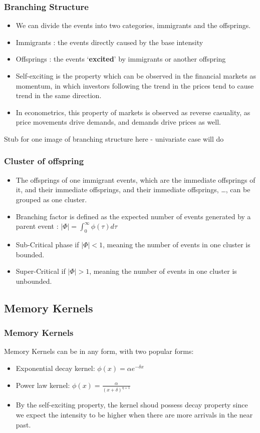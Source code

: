 \documentclass{beamer}
\begin{document}
\begin{frame}
\frametitle{Branching Structure}
\begin{itemize}
	\item We can divide the events into two categories, immigrants and the offsprings.
	\item Immigrants : the events directly caused by the base intensity
	\item Offsprings : the events `\textbf{excited}' by immigrants or another offspring
	\item Self-exciting is the property which can be observed in the financial markets as momentum, in which investors following the trend in the prices tend to cause trend in the same direction.
	\item In econometrics, this property of markets is observed as reverse casuality, as price movements drive demands, and demands drive prices as well.
\end{itemize}
Stub for one image of branching structure here - univariate case will do
\end{frame}

\begin{frame}
\frametitle{Cluster of offspring}
\begin{itemize}
	\item The offsprings of one immigrant events, which are the immediate offsprings of it, and their immediate offsprings, and their immediate offsprings, \dots, can be grouped as one cluster.
	\item Branching factor is defined as the expected number of events generated by a parent event : $\mid \Phi \mid = \int_0^{\infty} \phi(\tau) d\tau$
	\item Sub-Critical phase if $\mid \Phi \mid < 1$, meaning the number of events in one cluster is bounded.
	\item Super-Critical if $\mid \Phi \mid > 1$, meaning the number of events in one cluster is unbounded.
\end{itemize}
\end{frame}

\subsection{Memory Kernels}

\begin{frame}
\frametitle{Memory Kernels}
Memory Kernels can be in any form, with two popular forms:
\begin{itemize}
	\item Exponential decay kernel: $\phi(x) = \alpha e^{-\delta x}$
	\item Power law kernel: $\phi(x) = \frac{\alpha}{(x + \delta)^{\eta + 1}}$
	\item By the self-exciting property, the kernel shoud possess decay property since we expect the intensity to be higher when there are more arrivals in the near past.
\end{itemize}
\end{frame}
\end{document}
